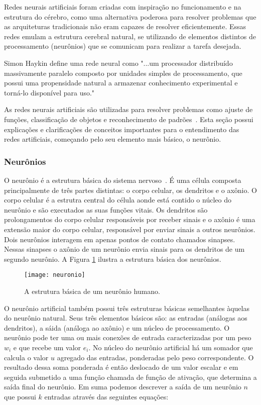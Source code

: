 Redes neurais artificiais foram criadas com inspiração no funcionamento e na estrutura do cérebro, como uma alternativa poderosa para resolver problemas que as arquiteturas tradicionais não eram capazes de resolver eficientemente. Essas redes emulam a estrutura cerebral natural, se utilizando de elementos distintos de processamento (neurônios) que se comunicam para realizar a tarefa desejada. 

Simon Haykin define uma rede neural como "...um processador distribuído massivamente paralelo composto por unidades simples de processamento, que possui uma propensidade natural a armazenar conhecimento experimental e torná-lo disponível para uso."

As redes neurais artificiais são utilizadas para resolver problemas como ajuste de funções, classificação de objetos e reconhecimento de padrões~\cite{kohonen1990self}. Esta seção possui explicações e clarificações de conceitos importantes para o entendimento das redes artificiais, começando pelo seu elemento mais básico, o neurônio.

\subsubsection{Neurônios}

O neurônio é a estrutura básica do sistema nervoso~\cite{chiras2013human}. É uma célula composta principalmente de três partes distintas: o corpo celular, os dendritos e o axônio. O corpo celular é a estrutra central do célula aonde está contido o núcleo do neurônio e são executados as suas funções vitais. Os dendritos são prolongamentos do corpo celular responsáveis por receber sinais e o axônio é uma extensão maior do corpo celular, responsável por enviar sinais a outros neurônios. Dois neurônios interagem em apenas  pontos de contato chamados sinapses. Nessas sinapses o axônio de um neurônio envia sinais para os dendritos de um segundo neurônio. A Figura \ref{fig:neuronio} ilustra a estrutura básica dos neurônios.

\begin{figure}
\centering
\texttt{[image: neuronio]}
\caption[A estrutura básica de um neurônio humano.]{A estrutura básica de um neurônio humano.\protect\footnotemark}
\label{fig:neuronio}
\centering
\end{figure}

O neurônio artificial também possui três estruturas básicas semelhantes àquelas do neurônio natural. Seus três elementos básicos são: as entradas (análogas aos dendritos), a sáida (análoga ao axônio) e um núcleo de processamento. 
O neurônio pode ter uma ou mais conexões de entrada caracterizadas por um peso $w_i$ e que recebe um valor $e_i$. No núcleo do neurônio artificial há um somador que calcula o valor $u$ agregado das entradas, ponderadas pelo peso correspondente. O resultado dessa soma ponderada é então deslocado de um valor escalar e em seguida submetido a uma função chamada de função de ativação, que determina a saída final do neurônio. Em suma podemos descrever a saída de um neurônio $n$ que possui $k$ entradas através das seguintes equações:

